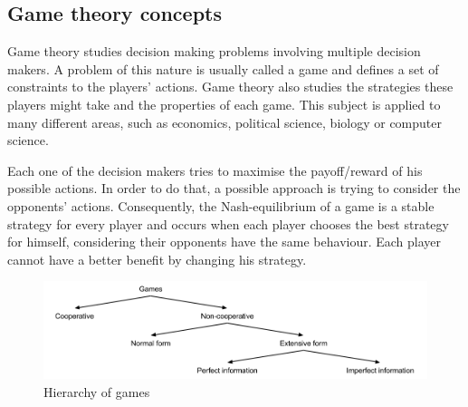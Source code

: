 \subsection{Game theory concepts}

Game theory studies decision making problems involving multiple decision makers.
A problem of this nature is usually called a game and defines a set of constraints to the players' actions.
Game theory also studies the strategies these players might take and the properties of each game.
This subject is applied to many different areas, such as economics, political science, biology or computer science.

Each one of the decision makers tries to maximise the payoff/reward of his possible actions.
In order to do that, a possible approach is trying to consider the opponents' actions.
Consequently, the Nash-equilibrium \cite{Nash1950} of a game is a stable strategy for every player and occurs when each player chooses the best strategy for himself, considering their opponents have the same behaviour.
Each player cannot have a better benefit by changing his strategy.

\begin{figure}
\centering
\includegraphics[width=1\textwidth]{./img/gamesHierarchy}
\caption{Hierarchy of games}
\label{fig:games}
\end{figure}

